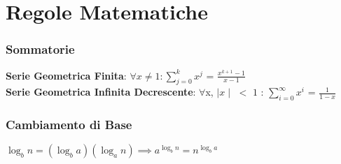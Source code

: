 \documentclass[../cheatSheetAlgoritmi.tex]{subfiles}
\begin{document}
\chapter{Regole Matematiche} \subsection{Sommatorie}
\textbf{Serie Geometrica Finita}: $\forall$$x \neq 1 : \sum\limits_{j=0}^{k} {x^{j}}$ = $\frac{x^{k+1} - 1}{x - 1}$ \\
\textbf{Serie Geometrica Infinita Decrescente}: $\forall$x, $\mid x \mid$ $<$ $1$ : $\sum\limits_{i=0}^{\infty} {x^{i}}$ = ${\frac{1}{1-x}}$
\subsection{Cambiamento di Base}
$\log_{b}{n} = (\log_{b}{a})(\log_{a}{n}) \implies a^{\log_{b}{n}} = n^{\log_{b}{a}}$

\newpage
\end{document}
